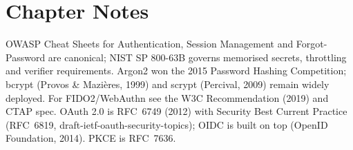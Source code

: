 \section*{Chapter Notes}
OWASP Cheat Sheets for Authentication, Session Management and Forgot-Password are canonical; NIST SP 800-63B governs memorised secrets, throttling and verifier requirements. Argon2 won the 2015 Password Hashing Competition; bcrypt (Provos \& Mazi\`eres, 1999) and scrypt (Percival, 2009) remain widely deployed. For FIDO2/WebAuthn see the W3C Recommendation (2019) and CTAP spec. OAuth 2.0 is RFC~6749 (2012) with Security Best Current Practice (RFC~6819, draft-ietf-oauth-security-topics); OIDC is built on top (OpenID Foundation, 2014). PKCE is RFC~7636.
